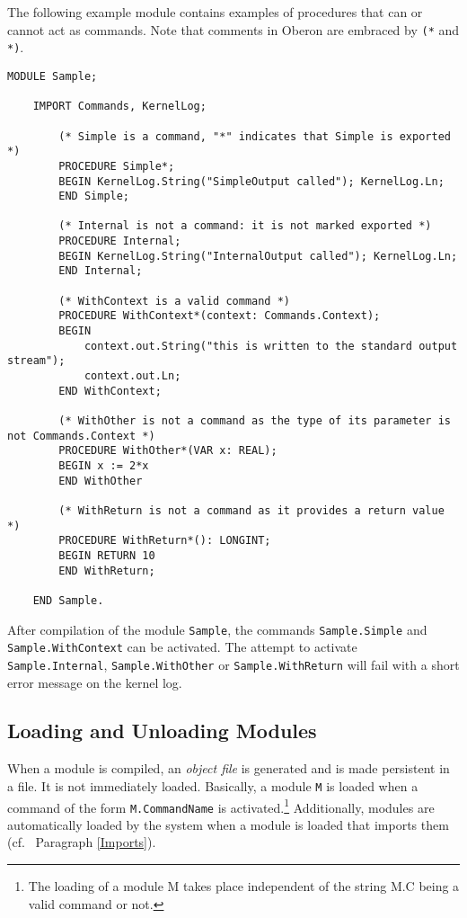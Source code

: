 \documentclass[a4paper,11pt]{article}
\begin{document}
The following example module contains examples of procedures that can or cannot act as commands. Note that comments in Oberon are embraced by \verb+(*+ and \verb+*)+.
\begin{lstlisting}[language=Oberon,frame=none,caption=Procedures and Commands]
    MODULE Sample;

    IMPORT Commands, KernelLog;

        (* Simple is a command, "*" indicates that Simple is exported *)
        PROCEDURE Simple*;
        BEGIN KernelLog.String("SimpleOutput called"); KernelLog.Ln;
        END Simple;

        (* Internal is not a command: it is not marked exported *)
        PROCEDURE Internal;
        BEGIN KernelLog.String("InternalOutput called"); KernelLog.Ln;
        END Internal;

        (* WithContext is a valid command *)
        PROCEDURE WithContext*(context: Commands.Context);
        BEGIN
            context.out.String("this is written to the standard output stream");
            context.out.Ln;
        END WithContext;

        (* WithOther is not a command as the type of its parameter is not Commands.Context *)
        PROCEDURE WithOther*(VAR x: REAL);
        BEGIN x := 2*x
        END WithOther

        (* WithReturn is not a command as it provides a return value *)
        PROCEDURE WithReturn*(): LONGINT;
        BEGIN RETURN 10
        END WithReturn;

    END Sample.
\end{lstlisting}

After compilation of the module \verb+Sample+, the commands \verb+Sample.Simple+ and \verb+Sample.WithContext+ can be activated. The attempt to activate \verb+Sample.Internal+, \verb+Sample.WithOther+ or \verb+Sample.WithReturn+ will fail with a short error message on the kernel log.

\subsection{Loading and Unloading Modules}
When a module is compiled, an {\em object file} is generated and is made persistent in a file. It is not immediately loaded.
Basically, a module \verb+M+ is loaded when a command of the form \verb+M.CommandName+ is activated.\footnote{The loading of a module M takes place independent of the string M.C being a valid command or not.} Additionally, modules are automatically loaded by the system when a module is loaded that imports them (cf.~ Paragraph \ref{Imports}).
\end{document}
